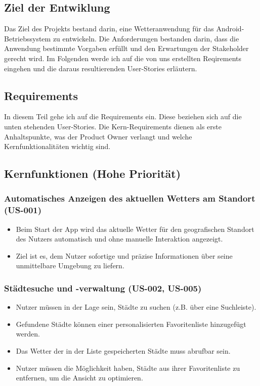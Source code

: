 \documentclass{article}
\begin{document}
\subsection{Ziel der Entwiklung}
Das Ziel des Projekts bestand darin, eine Wetteranwendung für das Android-Betriebssystem zu entwickeln. Die Anforderungen bestanden darin, dass die Anwendung bestimmte Vorgaben erfüllt und den Erwartungen der Stakeholder gerecht wird.
Im Folgenden werde ich auf die von uns erstellten Reqirements eingehen und die daraus resultierenden User-Stories erläutern.

\subsection{Requirements}
In diesem Teil gehe ich auf die Requirements ein. Diese beziehen sich auf die unten stehenden User-Stories. Die Kern-Requirements dienen als erste Anhaltspunkte, was der Product Owner verlangt und welche Kernfunktionalitäten wichtig sind.

\subsection{Kernfunktionen (Hohe Priorität)}

\subsubsection{Automatisches Anzeigen des aktuellen Wetters am Standort (US-001)}
\begin{itemize}
    \item Beim Start der App wird das aktuelle Wetter für den geografischen Standort des Nutzers automatisch und ohne manuelle Interaktion angezeigt.
    \item Ziel ist es, dem Nutzer sofortige und präzise Informationen über seine unmittelbare Umgebung zu liefern.
\end{itemize}

\subsubsection{Städtesuche und -verwaltung (US-002, US-005)}
\begin{itemize}
    \item Nutzer müssen in der Lage sein, Städte zu suchen (z.B. über eine Suchleiste).
    \item Gefundene Städte können einer personalisierten Favoritenliste hinzugefügt werden.
    \item Das Wetter der in der Liste gespeicherten Städte muss abrufbar sein.
    \item Nutzer müssen die Möglichkeit haben, Städte aus ihrer Favoritenliste zu entfernen, um die Ansicht zu optimieren.
\end{itemize}
\end{document}
